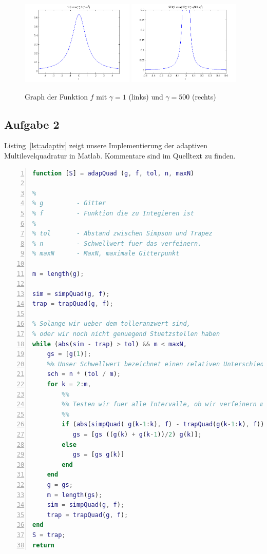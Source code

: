 \documentclass[11pt,a4paper,ngerman]{article}
\begin{document}
\begin{figure}[h!]
\centering
\includegraphics[width=0.48\textwidth]{f1.png}
\includegraphics[width=0.48\textwidth]{f2.png}
\caption{Graph der Funktion $f$ mit $\gamma = 1$ (links) und $\gamma = 500$ (rechts) \label{fig:f}}
\end{figure}


\subsection*{Aufgabe 2}

Listing~\ref{lst:adaptiv} zeigt unsere Implementierung der adaptiven Multilevelquadratur in Matlab.
Kommentare sind im Quelltext zu finden.

\begin{lstlisting}[language=matlab,numbers=left,caption=Adaptive Multilevel-Quadratur,label=lst:adaptiv]
function [S] = adapQuad (g, f, tol, n, maxN)

%
% g         - Gitter
% f         - Funktion die zu Integieren ist
%
% tol       - Abstand zwischen Simpson und Trapez
% n         - Schwellwert fuer das verfeinern.
% maxN      - MaxN, maximale Gitterpunkt

m = length(g);

sim = simpQuad(g, f);
trap = trapQuad(g, f);

% Solange wir ueber dem tolleranzwert sind,
% oder wir noch nicht genuegend Stuetzstellen haben
while (abs(sim - trap) > tol) && m < maxN,
    gs = [g(1)];
    %% Unser Schwellwert bezeichnet einen relativen Unterschied zur durchschnittlichen Grenze
    sch = n * (tol / m);
    for k = 2:m,
        %%
        %% Testen wir fuer alle Intervalle, ob wir verfeinern muessen
        %%
        if (abs(simpQuad( g(k-1:k), f) - trapQuad(g(k-1:k), f))) > sch
           gs = [gs ((g(k) + g(k-1))/2) g(k)];
        else
           gs = [gs g(k)]
        end
    end
    g = gs;
    m = length(gs);
    sim = simpQuad(g, f);
    trap = trapQuad(g, f);
end
S = trap;
return
\end{lstlisting}
\end{document}
